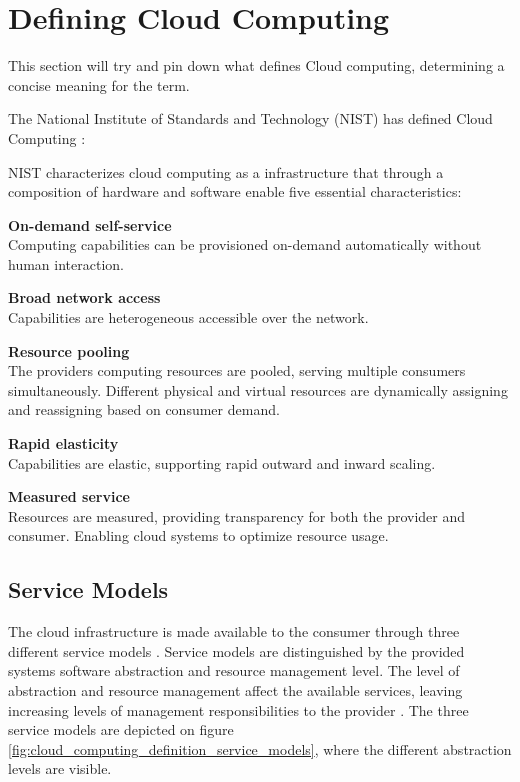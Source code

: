 \section{Defining Cloud Computing}
This section will try and pin down what defines Cloud computing, determining a concise meaning for the term.

The National Institute of Standards and Technology (NIST) has defined Cloud Computing \cite{mell2011nist}:


NIST characterizes cloud computing as a infrastructure that through a composition of hardware and software enable five essential characteristics:

\textbf{On-demand self-service}\\
Computing capabilities can be provisioned on-demand automatically without human interaction.

\textbf{Broad network access}\\
Capabilities are heterogeneous accessible over the network.

\textbf{Resource pooling}\\
The providers computing resources are pooled, serving multiple consumers simultaneously. Different physical and virtual resources are dynamically assigning and reassigning based on consumer demand.

\textbf{Rapid elasticity}\\
Capabilities are elastic, supporting rapid outward and inward scaling. 

\textbf{Measured service}\\
Resources are measured, providing transparency for both the provider and consumer. Enabling cloud systems to optimize resource usage.

\subsection{Service Models}
The cloud infrastructure is made available to the consumer through three different service models \cite{mell2011nist}. Service models are distinguished by the provided systems software abstraction and resource management level. The level of abstraction and resource management affect the available services, leaving increasing levels of management responsibilities to the provider \cite[p. 52]{armbrust2010view}.
The three service models are depicted on figure \ref{fig:cloud_computing_definition_service_models}, where the different abstraction levels are visible.

